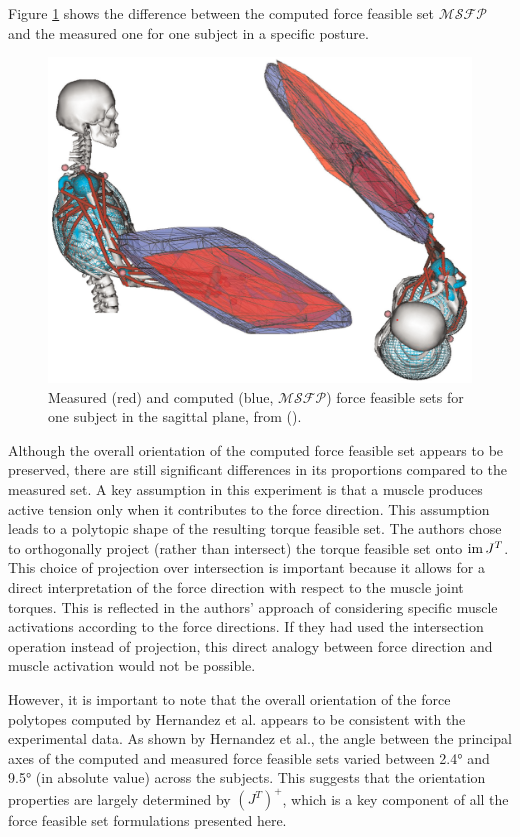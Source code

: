 Figure \ref{fig:hernandez2016} shows the difference between the computed force feasible set $\mathcal{MSFP}$ and the measured one for one subject in a specific posture.
\begin{figure}[!htb]
    \captionsetup{justification=centering}
        \centering
        \includegraphics[trim={0 0 0 0},clip,width=0.7\linewidth]{img/chapter_1/hernandez_force.png}
    \caption{Measured (red) and computed (blue, $\mathcal{MSFP}$) force feasible sets for one subject in the sagittal plane, from (\cite{hernandezIsometricForceCapabilities2015}).}
    \label{fig:hernandez2016}
\end{figure}

Although the overall orientation of the computed force feasible set appears to be preserved, there are still significant differences in its proportions compared to the measured set. A key assumption in this experiment is that a muscle produces active tension only when it contributes to the force direction. This assumption leads to a polytopic shape of the resulting torque feasible set. The authors chose to orthogonally project (rather than intersect) the torque feasible set onto $\operatorname{im}{J^T}$. This choice of projection over intersection is important because it allows for a direct interpretation of the force direction with respect to the muscle joint torques. This is reflected in the authors' approach of considering specific muscle activations according to the force directions. If they had used the intersection operation instead of projection, this direct analogy between force direction and muscle activation would not be possible.

However, it is important to note that the overall orientation of the force polytopes computed by Hernandez et al. appears to be consistent with the experimental data. As shown by Hernandez et al., the angle between the principal axes of the computed and measured force feasible sets varied between 2.4° and 9.5° (in absolute value) across the subjects. This suggests that the orientation properties are largely determined by $(J^T)^+$, which is a key component of all the force feasible set formulations presented here. 

